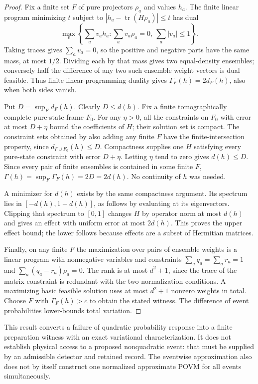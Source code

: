 \documentclass[11pt,a4paper]{article}
\theoremstyle{definition}
\theoremstyle{remark}\newtheorem{remark}[theorem]{Remark}
\begin{document}
\begin{proof}
Fix a finite set $F$ of pure projectors $\rho_a$ and values $h_a$.
The finite linear program minimizing $t$ subject to
$|h_a-\operatorname{tr}(H\rho_a)|\le t$ has dual
\[
 \max_v\left\{\sum_av_ah_a:
       \sum_av_a\rho_a=0,\ \sum_a|v_a|\le1\right\}.
\]
Taking traces gives $\sum_av_a=0$, so the positive and negative parts
have the same mass, at most $1/2$. Dividing each by that mass gives two
equal-density ensembles; conversely half the difference of any two such
ensemble weight vectors is dual feasible. Thus finite linear-programming
duality gives $\Gamma_F(h)=2d_F(h)$, also when both sides vanish.

Put $D=\sup_Fd_F(h)$. Clearly $D\le d(h)$. Fix a finite tomographically
complete pure-state frame $F_0$. For any $\eta>0$, all the constraints
on $F_0$ with error at most $D+\eta$ bound the coefficients of $H$;
their solution set is compact. The constraint sets obtained by also
adding any finite $F$ have the finite-intersection property, since
$d_{F\cup F_0}(h)\le D$. Compactness supplies one $H$ satisfying every
pure-state constraint with error $D+\eta$. Letting $\eta$ tend to zero
gives $d(h)\le D$. Since every pair of finite ensembles is contained in
some finite $F$, $\Gamma(h)=\sup_F\Gamma_F(h)=2D=2d(h)$.
No continuity of $h$ was needed.

A minimizer for $d(h)$ exists by the same compactness argument.
Its spectrum lies in $[-d(h),1+d(h)]$, as follows by evaluating at
its eigenvectors. Clipping that spectrum to $[0,1]$ changes $H$ by
operator norm at most $d(h)$ and gives an effect with uniform error at
most $2d(h)$. This proves the upper effect bound; the lower follows
because effects are a subset of Hermitian matrices.

Finally, on any finite $F$ the maximization over pairs of ensemble
weights is a linear program with nonnegative variables and constraints
$\sum_aq_a=\sum_ar_a=1$ and
$\sum_a(q_a-r_a)\rho_a=0$. The rank is at most $d^2+1$, since the
trace of the matrix constraint is redundant with the two normalization
conditions. A maximizing basic feasible solution uses at most $d^2+1$
nonzero weights in total. Choose $F$ with $\Gamma_F(h)>c$ to obtain
the stated witness. The difference of event probabilities lower-bounds
total variation.
\end{proof}

This result converts a failure of quadratic probability response into a
finite preparation witness with an exact variational characterization.
It does not establish physical access to a proposed nonquadratic event:
that must be supplied by an admissible detector and retained record.
The eventwise approximation also does not by itself construct one
normalized approximate POVM for all events simultaneously.
\end{document}
